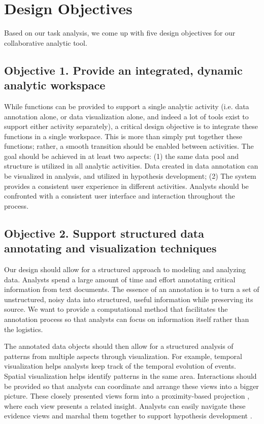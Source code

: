 \section{Design Objectives}\label{design-objectives}

Based on our task analysis, we come up with five design objectives for our collaborative analytic tool.

\subsection{Objective 1. Provide an integrated, dynamic  analytic workspace}

While functions can be provided to support a single analytic activity (i.e. data annotation alone, or data visualization alone, and indeed a lot of tools exist to support either activity separately), a critical design objective is to integrate these functions in a single workspace. This is more than simply put together these functions; rather, a smooth transition should be enabled between activities. The goal should be achieved in at least two aspects: (1)
the same data pool and structure is utilized in all analytic activities. Data
created in data annotation can be visualized in analysis, and utilized in
hypothesis development; (2) The system provides a consistent user experience in
different activities. Analysts should be confronted with a consistent user
interface and interaction throughout the process.


\subsection{Objective 2. Support structured data annotating and visualization techniques}

Our design should allow for a structured approach to modeling and analyzing data. Analysts spend a large amount of time and effort annotating critical information from text documents. The essence of an annotation is to turn a set of unstructured, noisy data into structured, useful information while preserving its source. We want to provide a computational method that facilitates the annotation process so that analysts can focus on information itself rather than the logistics. 

The annotated data objects should then allow for a structured analysis of patterns from multiple aspects through visualization. For example, temporal visualization helps analysts keep track of the temporal evolution
of events. Spatial visualization helps identify patterns in the same area. Interactions should be provided so that analysts can coordinate and arrange these views into a bigger picture. These closely presented views form into a proximity-based projection \citep{Kang2014a}, where each view presents a related insight. Analysts can easily navigate these evidence views and marshal them together to support hypothesis development \citep{Pirolli2005}. 


